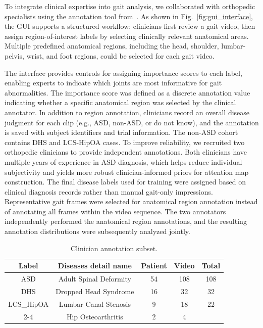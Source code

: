 \documentclass[review,authoryear,times]{elsarticle}
\begin{document}
To integrate clinical expertise into gait analysis, we collaborated with orthopedic specialists using the annotation tool from~\cite{chen2023two}. 
As shown in Fig.~\ref{fig:gui_interface}, the GUI supports a structured workflow: clinicians first review a gait video, then assign region-of-interest labels by selecting clinically relevant anatomical areas. 
Multiple predefined anatomical regions, including the head, shoulder, lumbar-pelvis, wrist, and foot regions,
could be selected for each gait video.

The interface provides controls for assigning importance scores to each label, enabling experts to indicate which joints are most informative for gait abnormalities. 
The importance score was defined as a discrete annotation value indicating whether a specific anatomical region was selected by the clinical annotator.
In addition to region annotation, clinicians record an overall disease judgment for each clip (e.g., ASD, non-ASD, or do not know), and the annotation is saved with subject identifiers and trial information.
The non-ASD cohort contains DHS and LCS-HipOA cases.
To improve reliability, we recruited two orthopedic clinicians to provide independent annotations. Both clinicians have multiple years of experience in ASD diagnosis, which helps reduce individual subjectivity and yields more robust clinician-informed priors for attention map construction.
The final disease labels used for training were assigned based on clinical diagnosis records rather than manual gait-only impressions. 
Representative gait frames were selected for anatomical region annotation instead of annotating all frames within the video sequence. 
The two annotators independently performed the anatomical region annotations, and the resulting annotation distributions were subsequently analyzed jointly.

\begin{table}[!ht]
    \centering
    \small
    \caption{Clinician annotation subset.}
    \label{tab:clinician_annotation_subset}
    
    \begin{tabular}{|c|c|c|c|c|}
        \hline
        Label       & Diseases detail name   & Patient & Video & Total \\
        \hline
        ASD         & Adult Spinal Deformity & 54      & 108  & 108  \\
        \hline
        DHS         & Dropped Head Syndrome  & 16      & 32   & 32   \\
        \hline
        LCS\_HipOA  & Lumbar Canal Stenosis  & 9       & 18   & 22   \\
        \cline{2-4} & Hip Osteoarthritis     & 2       & 4    &       \\
        \hline
    \end{tabular}
\end{table}
\end{document}
